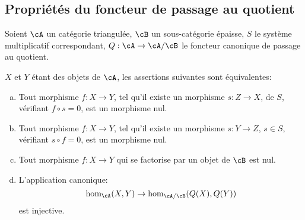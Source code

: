 \subsection{Propriétés du foncteur de passage au quotient}\label{VIII:2-5}

Soient $\cA$ un catégorie triangulée, $\cB$ un sous-catégorie épaisse, 
$S$ le système multiplicatif correspondant, $Q:\cA\to \cA/\cB$ le foncteur 
canonique de passage au quotient. 





\begin{proposition}\label{VIII:2-5-1}
$X$ et $Y$ étant des objets de $\cA$, les assertions suivantes sont 
équivalentes: 
\begin{enumerate}[(a)]
  \item Tout morphisme $f:X\to Y$, tel qu'il existe un morphisme $s:Z\to X$, de 
    $S$, vérifiant $f\circ s=0$, est un morphisme nul.
  \item Tout morphisme $f:X\to Y$, tel qu'il existe un morphisme $s:Y\to Z$, 
    $s\in S$, vérifiant $s\circ f=0$, est un morphisme nul. 
  \item Tout morphisme $f:X\to Y$ qui se factorise par un objet de $\cB$ est 
    nul. 
  \item L'application canonique: 
    \[
      \hom_\cA(X,Y) \to \hom_{\cA/\cB}(Q(X),Q(Y))
    \]
    est injective. 
\end{enumerate}
\end{proposition}





